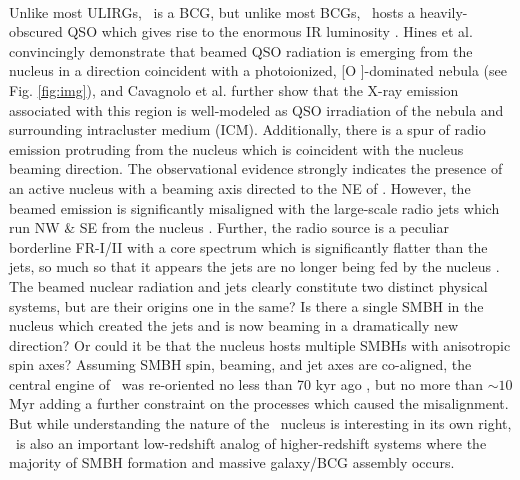 \documentclass[11pt]{article}
\begin{document}
\pagestyle{plain}

\\

Unlike most ULIRGs, \irs\ is a BCG, but unlike most BCGs, \irs\ hosts
a heavily-obscured QSO which gives rise to the enormous IR luminosity
\cite{kleinmann88, hines93, evans98}. Hines et al. \cite{hines99}
convincingly demonstrate that beamed QSO radiation is emerging from
the nucleus in a direction coincident with a photoionized, [O
  ]-dominated nebula (see Fig. \ref{fig:img}), and Cavagnolo
et al. \cite{cavagnolo10} further show that the X-ray emission
associated with this region is well-modeled as QSO irradiation of the
nebula and surrounding intracluster medium (ICM). Additionally, there
is a spur of radio emission protruding from the nucleus which is
coincident with the nucleus beaming direction. The observational
evidence strongly indicates the presence of an active nucleus with a
beaming axis directed to the NE of \irs. However, the beamed emission
is significantly misaligned with the large-scale radio jets which run
NW \& SE from the nucleus \cite{hines93, hines99}. Further, the radio
source is a peculiar borderline FR-I/II with a core spectrum which is
significantly flatter than the jets, so much so that it appears the
jets are no longer being fed by the nucleus \cite{hines93}. The beamed
nuclear radiation and jets clearly constitute two distinct physical
systems, but are their origins one in the same? Is there a single SMBH
in the nucleus which created the jets and is now beaming in a
dramatically new direction? Or could it be that the nucleus hosts
multiple SMBHs with anisotropic spin axes? Assuming SMBH spin,
beaming, and jet axes are co-aligned, the central engine of \irs\ was
re-oriented no less than 70 kyr ago \cite{hines99}, but no more than
$\sim 10$ Myr \cite{cavagnolo10} adding a further constraint on the
processes which caused the misalignment. But while understanding the
nature of the \irs\ nucleus is interesting in its own right, \irs\ is
also an important low-redshift analog of higher-redshift systems where
the majority of SMBH formation and massive galaxy/BCG assembly occurs.
\end{document}
